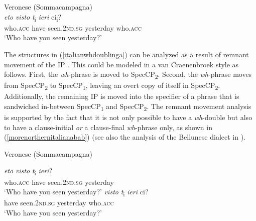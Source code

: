 \begin{exe}
\ex Veronese (Sommacampagna) \\
 {\textit{eto}} {\textit{visto}} {\textit{t}\textsubscript{i}} {\textit{ieri}} {{ci}\textsubscript{i}?}  \\
{who.\textsc{acc}} {have} {seen.\textsc{2nd.sg}} {} {yesterday} {who.\textsc{acc}} \\
\trans `Who have you seen yesterday?' \label{italianwhdoublinga} 


\end{exe}



\noindent The structures in (\ref{italianwhdoublinga}) can be analyzed as a result of remnant movement of the IP \citep{poletto2005wh}. This could be modeled in a van Craenenbroek style as follows. First, the \textit{wh}-phrase is moved to SpecCP\textsubscript{2}. Second, the \textit{wh}-phrase moves from SpecCP\textsubscript{2} to SpecCP\textsubscript{1}, leaving an overt copy of itself in SpecCP\textsubscript{2}. Additionally, the remaining IP is moved into the specifier of a phrase that is sandwiched in-between SpecCP\textsubscript{1} and SpecCP\textsubscript{2}. The remnant movement analysis is supported by the fact that it is not only possible to have a \textit{wh}-double but also to have a clause-initial \textit{or} a clause-final \textit{wh}-phrase only, as shown in (\ref{morenorthernitalianabab}) (see also the analysis of the Bellunese dialect in \citealt{munaro1999sintagmi, munaro1999underspecified, poletto2000left}).


\begin{exe}
\ex Veronese (Sommacampagna)\label{morenorthernitalianabab}

\begin{xlist}

\ex{} {\textit{eto}} {\textit{visto}} {\textit{t}\textsubscript{i}} {\textit{ieri}?}  \\
{who.\textsc{acc}} {have} {seen.\textsc{2nd.sg}} {} {yesterday} \\
\trans `Who have you seen yesterday?' \label{morenorthernitalianababaaaa} 
\ex{} {\textit{visto}}  {\textit{t}\textsubscript{i}} {\textit{ieri}} {ci?}  \\
{have} {seen.\textsc{2nd.sg}} {} {yesterday} {who.\textsc{acc}} \\
\trans `Who have you seen yesterday?' \label{morenorthernitalianabababaabb} 
\end{xlist}
\end{exe}



